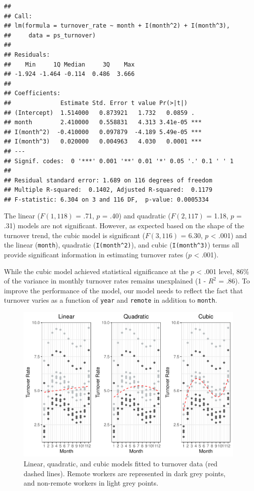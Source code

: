 \documentclass[
]{book}
\begin{document}
\begin{verbatim}
## 
## Call:
## lm(formula = turnover_rate ~ month + I(month^2) + I(month^3), 
##     data = ps_turnover)
## 
## Residuals:
##    Min     1Q Median     3Q    Max 
## -1.924 -1.464 -0.114  0.486  3.666 
## 
## Coefficients:
##              Estimate Std. Error t value Pr(>|t|)    
## (Intercept)  1.514000   0.873921   1.732   0.0859 .  
## month        2.410000   0.558831   4.313 3.41e-05 ***
## I(month^2)  -0.410000   0.097879  -4.189 5.49e-05 ***
## I(month^3)   0.020000   0.004963   4.030   0.0001 ***
## ---
## Signif. codes:  0 '***' 0.001 '**' 0.01 '*' 0.05 '.' 0.1 ' ' 1
## 
## Residual standard error: 1.689 on 116 degrees of freedom
## Multiple R-squared:  0.1402, Adjusted R-squared:  0.1179 
## F-statistic: 6.304 on 3 and 116 DF,  p-value: 0.0005334
\end{verbatim}

The linear (\(F(1,118)\) = .71, \(p\) = .40) and quadratic (\(F(2,117)\) = 1.18, \(p\) = .31) models are not significant. However, as expected based on the shape of the turnover trend, the cubic model is significant (\(F(3,116)\) = 6.30, \(p\) \textless{} .001) and the linear (\texttt{month}), quadratic (\texttt{I(month\^{}2)}), and cubic (\texttt{I(month\^{}3)}) terms all provide significant information in estimating turnover rates (\(p\) \textless{} .001).

While the cubic model achieved statistical significance at the \(p\) \textless{} .001 level, 86\% of the variance in monthly turnover rates remains unexplained (1 - \(R^2\) = .86). To improve the performance of the model, our model needs to reflect the fact that turnover varies as a function of \texttt{year} and \texttt{remote} in addition to \texttt{month}.

\begin{figure}

{\centering \includegraphics[width=1\linewidth]{The_Fundamentals_of_People_Analytics_files/figure-latex/turnover-pred-1} 

}

\caption{Linear, quadratic, and cubic models fitted to turnover data (red dashed lines). Remote workers are represented in dark grey points, and non-remote workers in light grey points.}\label{fig:turnover-pred}
\end{figure}
\end{document}
